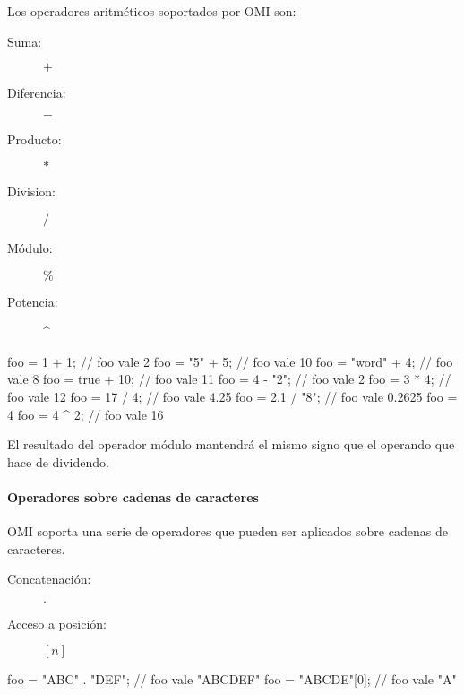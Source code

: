 Los operadores aritméticos soportados por OMI son:

\begin{description}
\item [Suma:] $+$
\item [Diferencia:] $-$
\item [Producto:] $*$
\item [Division:] $/$
\item [Módulo:] $\%$
\item [Potencia:] \^ \hfill   
\end{description} 


\begin{myverbatim}
   foo = 1 + 1; // foo vale 2
   foo = "5" + 5; // foo vale 10
   foo = "word" + 4; // foo vale 8
   foo = true + 10; // foo vale 11
   foo = 4 - "2"; // foo vale 2
   foo = 3 * 4; // foo vale 12
   foo = 17 / 4; // foo vale 4.25
   foo = 2.1 / "8"; // foo vale 0.2625
   foo = 4 %
   foo = 4 ^ 2; // foo vale 16 
\end{myverbatim} 

El resultado del operador módulo mantendrá el mismo signo que el operando que hace de dividendo.




\paragraph{Operadores sobre cadenas de caracteres}\label{sec:op_string}
OMI soporta una serie de operadores que pueden ser aplicados sobre cadenas de caracteres. 

\begin{description}
\item [Concatenación:] $.$
\item [Acceso a posición:] $[n]$
\end{description} 

\begin{myverbatim}
   foo = "ABC" . "DEF"; // foo vale "ABCDEF"
   foo = "ABCDE"[0]; // foo vale "A"
\end{myverbatim} 

